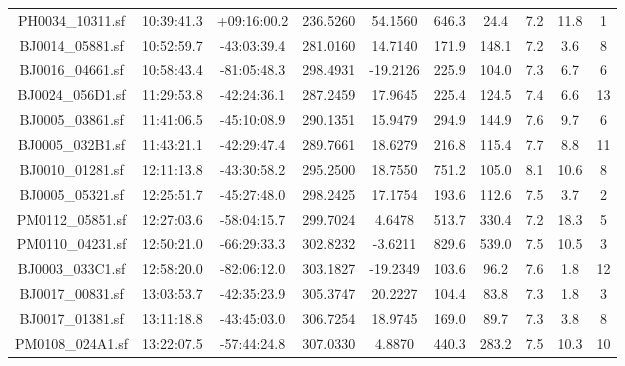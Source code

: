 \documentclass[fleqn,usenatbib]{mnras}
\begin{document}
\begin{table}
\begin{scriptsize}
\begin{center}
\begin{tabular}{@{\extracolsep{\fill}}c|c|c|c|c|c|c|c|c|c}
  PH0034\_10311.sf    &   10:39:41.3  &   +09:16:00.2   &    236.5260    &    54.1560    &    646.3    &    24.4    &    7.2    &    11.8    &    1    \\ 
  BJ0014\_05881.sf    &   10:52:59.7  &   -43:03:39.4   &    281.0160    &    14.7140    &    171.9    &    148.1    &    7.2    &    3.6    &    8    \\ 
  BJ0016\_04661.sf    &   10:58:43.4  &   -81:05:48.3   &    298.4931    &    -19.2126    &    225.9    &    104.0    &    7.3    &    6.7    &    6    \\ 
  BJ0024\_056D1.sf    &   11:29:53.8  &   -42:24:36.1   &    287.2459    &    17.9645    &    225.4    &    124.5    &    7.4    &    6.6    &    13    \\ 
  BJ0005\_03861.sf    &   11:41:06.5  &   -45:10:08.9   &    290.1351    &    15.9479    &    294.9    &    144.9    &    7.6    &    9.7    &    6    \\ 
  BJ0005\_032B1.sf    &   11:43:21.1  &   -42:29:47.4   &    289.7661    &    18.6279    &    216.8    &    115.4    &    7.7    &    8.8    &    11    \\ 
  BJ0010\_01281.sf    &   12:11:13.8  &   -43:30:58.2   &    295.2500    &    18.7550    &    751.2    &    105.0    &    8.1    &    10.6    &    8    \\ 
  BJ0005\_05321.sf    &   12:25:51.7  &   -45:27:48.0   &    298.2425    &    17.1754    &    193.6    &    112.6    &    7.5    &    3.7    &    2    \\ 
  PM0112\_05851.sf    &   12:27:03.6  &   -58:04:15.7   &    299.7024    &    4.6478    &    513.7    &    330.4    &    7.2    &    18.3    &    5    \\ 
  PM0110\_04231.sf    &   12:50:21.0  &   -66:29:33.3   &    302.8232    &    -3.6211    &    829.6    &    539.0    &    7.5    &    10.5    &    3    \\ 
  BJ0003\_033C1.sf    &   12:58:20.0  &   -82:06:12.0   &    303.1827    &    -19.2349    &    103.6    &    96.2    &    7.6    &    1.8    &    12    \\ 
  BJ0017\_00831.sf    &   13:03:53.7  &   -42:35:23.9   &    305.3747    &    20.2227    &    104.4    &    83.8    &    7.3    &    1.8    &    3    \\ 
  BJ0017\_01381.sf    &   13:11:18.8  &   -43:45:03.0   &    306.7254    &    18.9745    &    169.0    &    89.7    &    7.3    &    3.8    &    8    \\ 
  PM0108\_024A1.sf    &   13:22:07.5  &   -57:44:24.8   &    307.0330    &    4.8870    &    440.3    &    283.2    &    7.5    &    10.3    &    10    \\ 

\end{tabular}
\end{center}
\end{scriptsize}
\end{table}
\end{document}
